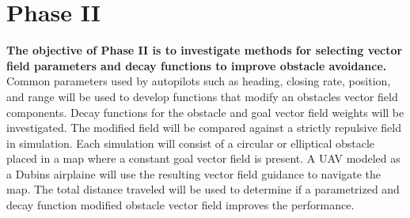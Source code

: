 \documentclass[numbered,pdftex]{ohio-etd}
\begin{document}
\section{Phase II}
\textbf{The objective of Phase II is to investigate methods for selecting vector field parameters and decay functions to improve obstacle avoidance.} Common parameters used by autopilots such as heading, closing rate, position, and range will be used to develop functions that modify an obstacles vector field components. Decay functions for the obstacle and goal vector field weights will be investigated. The modified field will be compared against a strictly repulsive field in simulation. Each simulation will consist of a circular or elliptical obstacle placed in a map where a constant goal vector field is present. A UAV modeled as a Dubins airplaine will use the resulting vector field guidance to navigate the map. The total distance traveled will be used to determine if a parametrized and decay function modified obstacle vector field improves the performance.

% 
% 
% 
%  


\end{document}
